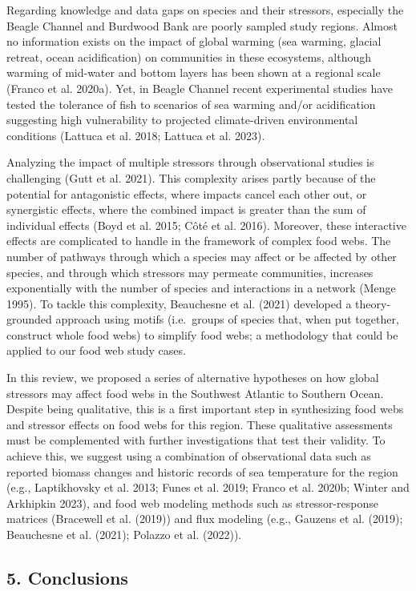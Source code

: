 \documentclass[
]{article}
\begin{document}
Regarding knowledge and data gaps on species and their stressors,
especially the Beagle Channel and Burdwood Bank are poorly sampled study
regions. Almost no information exists on the impact of global warming
(sea warming, glacial retreat, ocean acidification) on communities in
these ecosystems, although warming of mid-water and bottom layers has
been shown at a regional scale (Franco et al. 2020a). Yet, in Beagle
Channel recent experimental studies have tested the tolerance of fish to
scenarios of sea warming and/or acidification suggesting high
vulnerability to projected climate-driven environmental conditions
(Lattuca et al. 2018; Lattuca et al. 2023).

Analyzing the impact of multiple stressors through observational studies
is challenging (Gutt et al. 2021). This complexity arises partly because
of the potential for antagonistic effects, where impacts cancel each
other out, or synergistic effects, where the combined impact is greater
than the sum of individual effects (Boyd et al. 2015; Côté et al. 2016).
Moreover, these interactive effects are complicated to handle in the
framework of complex food webs. The number of pathways through which a
species may affect or be affected by other species, and through which
stressors may permeate communities, increases exponentially with the
number of species and interactions in a network (Menge 1995). To tackle
this complexity, Beauchesne et al. (2021) developed a theory-grounded
approach using motifs (i.e.~groups of species that, when put together,
construct whole food webs) to simplify food webs; a methodology that
could be applied to our food web study cases.

In this review, we proposed a series of alternative hypotheses on how
global stressors may affect food webs in the Southwest Atlantic to
Southern Ocean. Despite being qualitative, this is a first important
step in synthesizing food webs and stressor effects on food webs for
this region. These qualitative assessments must be complemented with
further investigations that test their validity. To achieve this, we
suggest using a combination of observational data such as reported
biomass changes and historic records of sea temperature for the region
(e.g., Laptikhovsky et al. 2013; Funes et al. 2019; Franco et al. 2020b;
Winter and Arkhipkin 2023), and food web modeling methods such as
stressor-response matrices (Bracewell et al. (2019)) and flux modeling
(e.g., Gauzens et al. (2019); Beauchesne et al. (2021); Polazzo et al.
(2022)).

\subsection{5. Conclusions}\label{conclusions}
\end{document}
